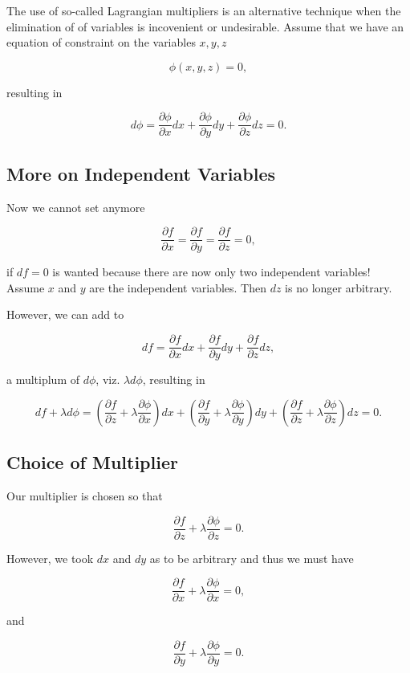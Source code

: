 \documentclass[%
oneside,                 %
final,                   %
10pt]{article}
\begin{document}
The use of so-called Lagrangian  multipliers is an alternative technique  when the elimination of
of variables is incovenient or undesirable.  Assume that we have an equation of constraint on the variables $x,y,z$

\[
\phi(x,y,z) = 0,
\]

 resulting in

\[
d\phi = \frac{\partial \phi}{\partial x}dx+\frac{\partial \phi}{\partial y}dy+\frac{\partial \phi}{\partial z}dz =0.
\]

\subsection{More on Independent Variables}

Now we cannot set anymore

\[
\frac{\partial f}{\partial x} =\frac{\partial f}{\partial y}=\frac{\partial f}{\partial z}=0,
\]

if $df=0$ is wanted
because there are now only two independent variables!  Assume $x$ and $y$ are the independent variables.
Then $dz$ is no longer arbitrary.

However, we can add to

\[
df = \frac{\partial f}{\partial x}dx+\frac{\partial f}{\partial y}dy+\frac{\partial f}{\partial z}dz,
\]

a multiplum of $d\phi$, viz. $\lambda d\phi$, resulting  in

\[
df+\lambda d\phi = (\frac{\partial f}{\partial z}+\lambda\frac{\partial \phi}{\partial x})dx+(\frac{\partial f}{\partial y}+\lambda\frac{\partial \phi}{\partial y})dy+(\frac{\partial f}{\partial z}+\lambda\frac{\partial \phi}{\partial z})dz =0.
\]

\subsection{Choice of Multiplier}

Our multiplier is chosen so that

\[
\frac{\partial f}{\partial z}+\lambda\frac{\partial \phi}{\partial z} =0.
\]

However, we took $dx$ and $dy$ as to be arbitrary and thus we must have

\[
\frac{\partial f}{\partial x}+\lambda\frac{\partial \phi}{\partial x} =0,
\]

and

\[
\frac{\partial f}{\partial y}+\lambda\frac{\partial \phi}{\partial y} =0.
\]
\end{document}

